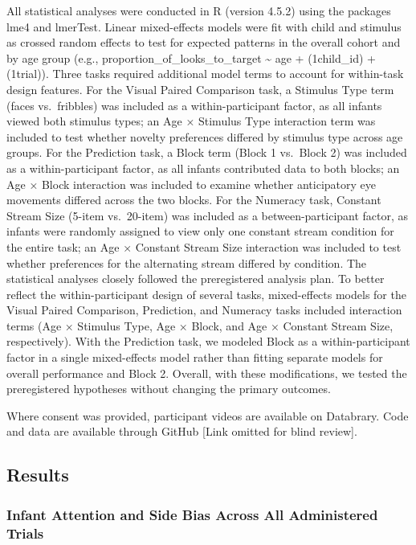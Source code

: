 \documentclass[
  english,
  man,floatsintext]{apa6}
\begin{document}
All statistical analyses were conducted in R (version 4.5.2) using the packages lme4 and lmerTest.
Linear mixed-effects models were fit with child and stimulus as crossed random effects to test for expected patterns in the overall cohort and by age group (e.g., proportion\_of\_looks\_to\_target \textasciitilde{} age + (1\textbar child\_id) + (1\textbar trial)).
Three tasks required additional model terms to account for within-task design features.
For the Visual Paired Comparison task, a Stimulus Type term (faces vs.~fribbles) was included as a within-participant factor, as all infants viewed both stimulus types; an Age × Stimulus Type interaction term was included to test whether novelty preferences differed by stimulus type across age groups.
For the Prediction task, a Block term (Block 1 vs.~Block 2) was included as a within-participant factor, as all infants contributed data to both blocks; an Age × Block interaction was included to examine whether anticipatory eye movements differed across the two blocks.
For the Numeracy task, Constant Stream Size (5-item vs.~20-item) was included as a between-participant factor, as infants were randomly assigned to view only one constant stream condition for the entire task; an Age × Constant Stream Size interaction was included to test whether preferences for the alternating stream differed by condition.
The statistical analyses closely followed the preregistered analysis plan.
To better reflect the within-participant design of several tasks, mixed-effects models for the Visual Paired Comparison, Prediction, and Numeracy tasks included interaction terms (Age × Stimulus Type, Age × Block, and Age × Constant Stream Size, respectively).
With the Prediction task, we modeled Block as a within-participant factor in a single mixed-effects model rather than fitting separate models for overall performance and Block 2.
Overall, with these modifications, we tested the preregistered hypotheses without changing the primary outcomes.

Where consent was provided, participant videos are available on Databrary.
Code and data are available through GitHub {[}Link omitted for blind review{]}.

\subsection{Results}\label{results}

\subsubsection{Infant Attention and Side Bias Across All Administered Trials}\label{infant-attention-and-side-bias-across-all-administered-trials}
\end{document}
